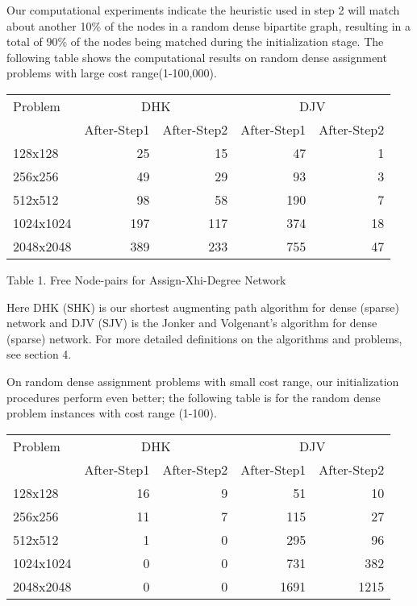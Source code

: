 Our computational experiments indicate the heuristic used in step 2
will match about another 10\% of the nodes in a random dense bipartite
graph, resulting in a total of 90\% of the nodes being matched during
the initialization stage. The following table shows the computational
results on random dense assignment problems with large cost range(1-100,000).


\vskip 5pt
{\small
\begin{tabular}{|l|rr|rr|} \hline
 Problem & \multicolumn{2}{c|}{DHK}& \multicolumn{2}{c|}{DJV}\\
&After-Step1 &After-Step2 &After-Step1 &After-Step2\\ \hline
128x128& 25& 15& 47& 1\\ 
256x256& 49& 29& 93& 3\\ 
512x512& 98& 58& 190& 7\\ 
1024x1024& 197& 117& 374& 18\\ 
2048x2048& 389& 233& 755& 47\\ \hline
\end{tabular}
}

\vskip 2pt
{Table 1. Free Node-pairs for Assign-Xhi-Degree Network}
\vskip 5pt

Here DHK (SHK) is our shortest augmenting path algorithm for dense (sparse)
network and DJV (SJV) is the Jonker and Volgenant's algorithm for dense 
(sparse) network. For more detailed definitions on the algorithms and problems,
see section 4.

On random dense assignment problems with small cost range, 
our initialization procedures perform
even better; the following table is for the random dense problem instances
with cost range (1-100).


\vskip 5pt
{\small
\begin{tabular}{|l|rr|rr|} \hline
 Problem & \multicolumn{2}{c|}{DHK}& \multicolumn{2}{c|}{DJV}\\
&After-Step1 &After-Step2 &After-Step1 &After-Step2\\ \hline
128x128& 16& 9& 51& 10\\ 
256x256& 11& 7& 115& 27\\ 
512x512& 1& 0& 295& 96\\ 
1024x1024& 0& 0& 731& 382\\ 
2048x2048& 0& 0& 1691& 1215\\ \hline
\end{tabular}
}

